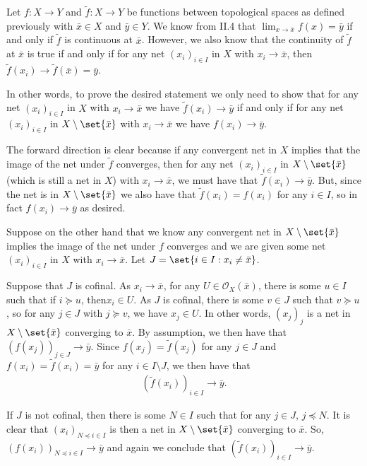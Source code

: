 \documentclass[10pt]{mypackage}
\begin{document}
\begin{solution}
  Let $f\colon X\to Y$ and $\tilde f\colon X\to Y$ be functions between topological spaces as defined previously with $\bar x\in X$ and $\bar y \in Y$. We know from II.4 that $\lim_{x\to\bar x} f(x) = \bar y$ if and only if $\tilde f$ is continuous at $\bar x$. However, we also know that the continuity of $\tilde f$ at $\bar x$ is true if and only if for any net $\left(x_i\right)_{i\in I}$ in $X$ with $x_i\to \bar x$, then $\tilde f\left(x_i\right)\to \tilde f(\bar x) = \bar y$.

In other words, to prove the desired statement we only need to show that for any net $\left(x_i\right)_{i\in I}$ in $X$ with $x_i\to \bar x$ we have $\tilde f\left(x_i\right)\to \bar y$ if and only if for any net $\left(x_i\right)_{i\in I}$ in $X\setminus \set{\bar x}$ with $x_i\to\bar x$ we have $f\left(x_i\right)\to \bar y$.

The forward direction is clear because if any convergent net in $X$ implies that the image of the net under $\tilde f$ converges, then for any net $\left(x_i\right)_{i\in I}$ in $X\setminus\set{\bar x}$ (which is still a net in $X$) with $x_i\to \bar x$, we must have that $\tilde f\left(x_i\right)\to \bar y$. But, since the net is in $X\setminus\set{\bar x}$ we also have that $\tilde f\left(x_i\right) = f\left(x_i\right)$ for any $i\in I$, so in fact $f\left(x_i\right)\to\bar y$ as desired.

Suppose on the other hand that we know any convergent net in $X\setminus \set{\bar x}$ implies the image of the net under $f$ converges and we are given some net $\left(x_i\right)_{i\in I}$ in $X$ with $x_i\to \bar x$. Let $J = \set{i \in I : x_i\neq \bar x}$.

Suppose that $J$ is cofinal. As $x_i\to\bar x$, for any $U\in \mathcal{O}_X\left(\bar x\right)$, there is some $u\in I$ such that if $i \succeq u $, then$ x_i\in U$. As $J$ is cofinal, there is some $v \in J$ such that $v \succeq u$, so for any $j\in J$ with $j\succeq v$, we have $x_j\in U$. In other words, $\left(x_j\right)_j$ is a net in $X\setminus \set{\bar x}$ converging to $\bar x$. By assumption, we then have that $\left(f\left(x_j\right)\right)_{j\in J}\to \bar y$. Since $f\left(x_j\right) = \tilde f\left(x_j\right)$ for any $j\in J$ and $f\left(x_i\right) = \tilde f\left(x_i\right) = \bar y$ for any $i \in I\setminus J$, we then have that 
\begin{align*}
  \left(\tilde f\left(x_i\right)\right)_{i\in I}\to \bar y.
\end{align*}

If $J$ is not cofinal, then there is some $N\in I$ such that for any $j \in J$, $j \preceq N$. It is clear that $\left(x_i\right)_{N\preceq i\in I}$ is then a net in $X\setminus \set{\bar x}$ converging to $\bar x$. So, $\left(f\left(x_i\right)\right)_{N \preceq i\in I}\to \bar y$ and again we conclude that $\left(\tilde f\left(x_i\right)\right)_{i\in I}\to \bar y$.
\end{solution}
\end{document}

